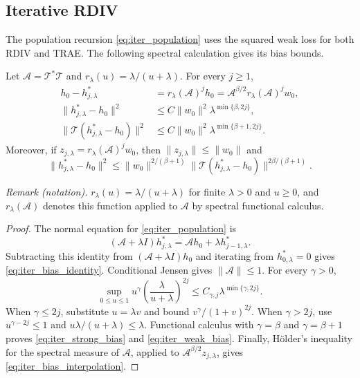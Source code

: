 \subsection{Iterative RDIV}

The population recursion \eqref{eq:iter_population} uses the squared weak
loss for both RDIV and TRAE. The following spectral calculation gives its
bias bounds.

\begin{lemma}\label{lemma:iter_bias}
Let $\mathcal A=\mathcal T^*\mathcal T$ and $r_\lambda(u)=\lambda/(u+\lambda)$. For every $j\geqslant1$,
\begin{align}
h_0-h_{j,\lambda}^*&=r_\lambda(\mathcal A)^j h_0
=\mathcal A^{\beta/2}r_\lambda(\mathcal A)^j w_0,
\label{eq:iter_bias_identity}\\
\|h_{j,\lambda}^*-h_0\|^2
&\leqslant C\|w_0\|^2\lambda^{\min\{\beta,2j\}},
\label{eq:iter_strong_bias}\\
\|\mathcal T(h_{j,\lambda}^*-h_0)\|^2
&\leqslant C\|w_0\|^2\lambda^{\min\{\beta+1,2j\}}.
\label{eq:iter_weak_bias}
\end{align}
Moreover, if $z_{j,\lambda}=r_\lambda(\mathcal A)^jw_0$, then $\|z_{j,\lambda}\|\leqslant\|w_0\|$ and
\begin{equation}\label{eq:iter_bias_interpolation}
\|h_{j,\lambda}^*-h_0\|^2
\leqslant
\|w_0\|^{2/(\beta+1)}
\|\mathcal T(h_{j,\lambda}^*-h_0)\|^{2\beta/(\beta+1)}.
\end{equation}
\end{lemma}

\noindent\textit{Remark (notation).} $r_\lambda(u)=\lambda/(u+\lambda)$ for finite $\lambda>0$ and $u\geqslant0$, and $r_\lambda(\mathcal A)$ denotes this function applied to $\mathcal A$ by spectral functional calculus.

\begin{proof}
The normal equation for \eqref{eq:iter_population} is
\[
(\mathcal A+\lambda I)h_{j,\lambda}^* =\mathcal A h_0+\lambda h_{j-1,\lambda}^*.
\]
Subtracting this identity from $(\mathcal A+\lambda I)h_0$ and iterating from $h_{0,\lambda}^*=0$ gives \eqref{eq:iter_bias_identity}. Conditional Jensen gives $\|\mathcal A\|\leqslant1$. For every $\gamma>0$,
\[
\sup_{0\leqslant u\leqslant1}
u^\gamma\left(\frac{\lambda}{u+\lambda}\right)^{2j}
\leqslant C_{\gamma,j}\lambda^{\min\{\gamma,2j\}}.
\]
When $\gamma\leqslant2j$, substitute $u=\lambda v$ and bound $v^\gamma/(1+v)^{2j}$. When $\gamma>2j$, use $u^{\gamma-2j}\leqslant1$ and $u\lambda/(u+\lambda)\leqslant\lambda$. Functional calculus with $\gamma=\beta$ and $\gamma=\beta+1$ proves \eqref{eq:iter_strong_bias} and \eqref{eq:iter_weak_bias}. Finally, H\"older's inequality for the spectral measure of $\mathcal A$, applied to $\mathcal A^{\beta/2}z_{j,\lambda}$, gives \eqref{eq:iter_bias_interpolation}.
\end{proof}

